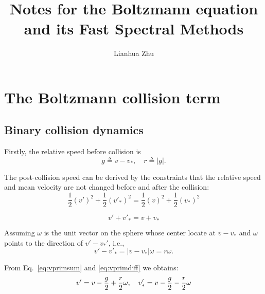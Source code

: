 \documentclass[11pt]{amsart}
\title{Notes for the Boltzmann equation and its Fast Spectral Methods}
\author{Lianhua Zhu}
\begin{document}
\maketitle
\section{The Boltzmann collision term}
\subsection{Binary collision dynamics}



Firstly, the relative speed before collision is
\begin{equation}
g \triangleq v-v_*, \quad r \triangleq |g|.
\end{equation}

The post-collision speed can be derived by the constraints that the relative speed and mean velocity  are not changed before and after the collision:
\begin{equation}
\frac{1}{2} (v')^2 + \frac{1}{2}(v'_*)^2 = \frac{1}{2} (v)^2 + \frac{1}{2}(v_*)^2
\end{equation}

\begin{equation}\label{eq:vprimsum}
v' + v'_* = v + v_*
\end{equation}

Assuming $\omega$ is the unit vector on the sphere whose center locate at $v-v_*$ and $\omega$ points to the direction of $v'-v_*'$, i.e.,
\begin{equation}\label{eq:vprimdiff}
v' - v'_* =  |v-v_*| \omega = r\omega.
\end{equation}

From Eq.~\eqref{eq:vprimsum} and \eqref{eq:vprimdiff} we obtains:
\begin{equation}
v' = v - {g\over2} + {r\over2} \omega,\quad v'_* = v - {g\over2} - {r\over2} \omega
\end{equation}


\end{document}
